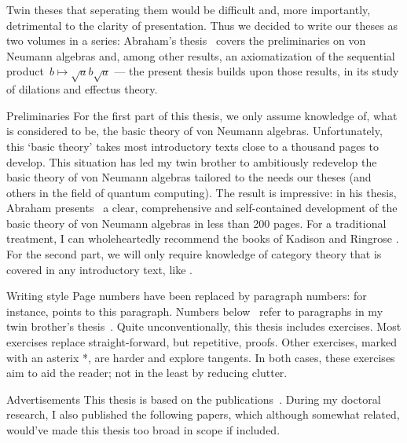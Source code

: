 \documentclass[b]{subfiles}
\begin{document}
\begin{parsec}
\begin{point}{Twin theses}
    that seperating them would be difficult
    and, more importantly, detrimental to the clarity of presentation.
Thus we decided to write our theses as two volumes in a series:
    Abraham's thesis~\cite{bram} covers the preliminaries on von Neumann
    algebras and, among other results, an axiomatization of
        the sequential product~$b\mapsto \sqrt{a}b\sqrt{a}$
        --- the present thesis
            builds upon those results,
            in its study of dilations and effectus theory.
\end{point}
\begin{point}{Preliminaries}%
For the first part of this thesis,
    we only assume knowledge of, what is considered to be,
    the basic theory of von Neumann algebras.
Unfortunately, this `basic theory' takes most introductory texts
    close to a thousand pages to develop.
This situation has led my twin brother to ambitiously
     redevelop the basic theory of von Neumann algebras
     tailored to the needs our theses (and others
     in the field of quantum computing).
The result is impressive:
    in his thesis, Abraham presents~\cite{bram}
    a clear, comprehensive and self-contained development of the basic
    theory of von Neumann algebras in less than 200 pages.
For a traditional treatment,
    I can wholeheartedly recommend the books of Kadison and Ringrose \cite{kr}.
For the second part,
    we will only require knowledge of category theory
        that is covered in any introductory text, like \cite{awodey}.
\end{point}
\begin{point}{Writing style}%
Page numbers have been replaced by paragraph numbers:
    for instance,  points to this paragraph.
Numbers below~
    refer to paragraphs in my twin brother's thesis~\cite{bram}.
Quite unconventionally, this thesis includes exercises.
Most exercises replace straight-forward, but repetitive, proofs.
Other exercises, marked with an asterix *,
    are harder and explore tangents.
In both cases, these exercises aim to aid the reader;
    not in the least by reducing clutter.
\end{point}
\begin{point}{Advertisements}%
This thesis is based on the publications~\cite{wwpaschke,westerbaan2016universal,cho2015quotient,statesofconvexsets}.
During my doctoral research,
    I also published the following papers,
    which although somewhat related,
    would've made this thesis too broad in scope if included.
\begin{enumerate}

\end{enumerate}
\end{point}
\end{parsec}
\end{document}
